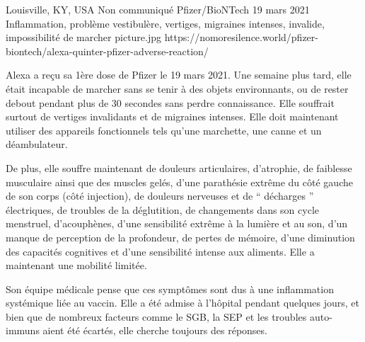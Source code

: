 {Louisville, KY, USA}
{Non communiqué}
{Pfizer/BioNTech }
{19 mars 2021}
{Inflammation, problème vestibulère, vertiges, migraines intenses, invalide, impossibilité de marcher}
{picture.jpg}
{https://nomoresilence.world/pfizer-biontech/alexa-quinter-pfizer-adverse-reaction/}
{

Alexa a reçu sa 1ère dose de Pfizer le 19 mars 2021. Une semaine plus tard, elle
était incapable de marcher sans se tenir à des objets environnants, ou de rester
debout pendant plus de 30 secondes sans perdre connaissance. Elle souffrait
surtout de vertiges invalidants et de migraines intenses. Elle doit maintenant
utiliser des appareils fonctionnels tels qu'une marchette, une canne et un
déambulateur.

De plus, elle souffre maintenant de douleurs articulaires, d'atrophie, de
faiblesse musculaire ainsi que des muscles gelés, d'une parathésie extrême du
côté gauche de son corps (côté injection), de douleurs nerveuses et de “
décharges ” électriques, de troubles de la déglutition, de changements dans son
cycle menstruel, d'acouphènes, d'une sensibilité extrême à la lumière et au son,
d'un manque de perception de la profondeur, de pertes de mémoire, d'une
diminution des capacités cognitives et d'une sensibilité intense aux
aliments. Elle a maintenant une mobilité limitée.

Son équipe médicale pense que ces symptômes sont dus à une inflammation
systémique liée au vaccin. Elle a été admise à l'hôpital pendant quelques jours,
et bien que de nombreux facteurs comme le SGB, la SEP et les troubles
auto-immuns aient été écartés, elle cherche toujours des réponses.

}
